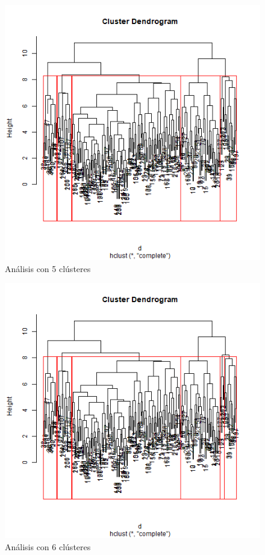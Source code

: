 \documentclass[a4paper,10pt,twocolumn]{article}
\begin{document}
	\begin{figure}[htb]%
		\begin{center}
			\includegraphics[width=\linewidth]{hier_cluster_5_euclidean}
		\end{center}
		\caption{Análisis con 5 clústeres \label{fig:hier_cluster_5_euclidean}}%
	\end{figure}
	
	\begin{figure}[htb]%
		\begin{center}
			\includegraphics[width=\linewidth]{hier_cluster_6_euclidean}
		\end{center}
		\caption{Análisis con 6 clústeres \label{fig:hier_cluster_6_euclidean}}%
	\end{figure}
	
\end{document}
